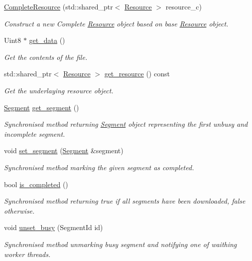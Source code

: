 \begin{DoxyCompactItemize}
\item 
\hyperlink{classsimpleP2P_1_1CompleteResource_a758df5fa183938450b71d1e36af8fbaf}{Complete\+Resource} (std\+::shared\+\_\+ptr$<$ \hyperlink{classsimpleP2P_1_1Resource}{Resource} $>$ resource\+\_\+c)
\begin{DoxyCompactList}\small\item\em Construct a new Complete \hyperlink{classsimpleP2P_1_1Resource}{Resource} object based on base \hyperlink{classsimpleP2P_1_1Resource}{Resource} object. \end{DoxyCompactList}\item 
Uint8 $\ast$ \hyperlink{classsimpleP2P_1_1CompleteResource_a28c22b852e21d864086440b82822ffa3}{get\+\_\+data} ()
\begin{DoxyCompactList}\small\item\em Get the contents of the file. \end{DoxyCompactList}\item 
std\+::shared\+\_\+ptr$<$ \hyperlink{classsimpleP2P_1_1Resource}{Resource} $>$ \hyperlink{classsimpleP2P_1_1CompleteResource_ac31825cc3bed61d181456430db3878f4}{get\+\_\+resource} () const
\begin{DoxyCompactList}\small\item\em Get the underlaying resource object. \end{DoxyCompactList}\item 
\hyperlink{classsimpleP2P_1_1Segment}{Segment} \hyperlink{classsimpleP2P_1_1CompleteResource_aabe86fbdc8daab23c1df0bc2abb91e7d}{get\+\_\+segment} ()
\begin{DoxyCompactList}\small\item\em Synchronised method returning \hyperlink{classsimpleP2P_1_1Segment}{Segment} object representing the first unbusy and incomplete segment. \end{DoxyCompactList}\item 
void \hyperlink{classsimpleP2P_1_1CompleteResource_a52ddae2486fb593cc315247af38014e7}{set\+\_\+segment} (\hyperlink{classsimpleP2P_1_1Segment}{Segment} \&segment)
\begin{DoxyCompactList}\small\item\em Synchronised method marking the given segment as completed. \end{DoxyCompactList}\item 
bool \hyperlink{classsimpleP2P_1_1CompleteResource_aaa20fce1d1d3fbd3f616debaedcaf7a3}{is\+\_\+completed} ()
\begin{DoxyCompactList}\small\item\em Synchronised method returning true if all segments have been downloaded, false otherwise. \end{DoxyCompactList}\item 
void \hyperlink{classsimpleP2P_1_1CompleteResource_af2dd5d30d807b11ecdad7feaf488df89}{unset\+\_\+busy} (Segment\+Id id)
\begin{DoxyCompactList}\small\item\em Synchronised method unmarking busy segment and notifying one of waithing worker threads. \end{DoxyCompactList}\end{DoxyCompactItemize}


